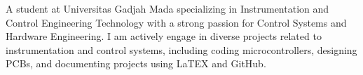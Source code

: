 

\begin{cvparagraph}

A student at Universitas Gadjah Mada specializing in Instrumentation and Control Engineering Technology with a strong passion for Control Systems and Hardware Engineering. I am actively engage in diverse projects related to instrumentation and control systems, including coding microcontrollers, designing PCBs, and documenting projects using LaTEX and GitHub.
\end{cvparagraph}